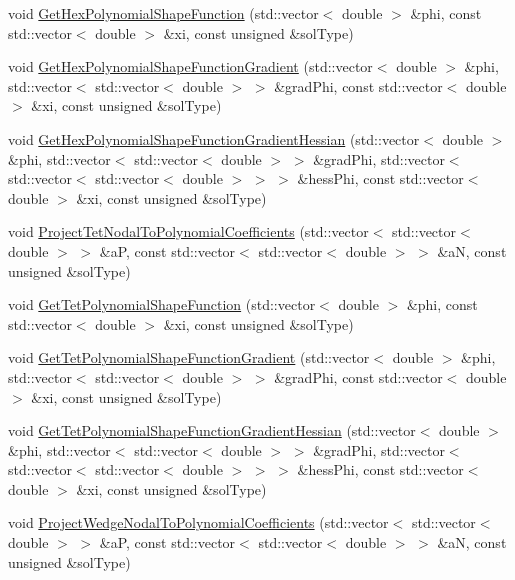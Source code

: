 \begin{DoxyCompactItemize}
\item 
void \mbox{\hyperlink{namespacefemus_ae4c2c2c514f4e0f9d59f4b57731a0f18}{Get\+Hex\+Polynomial\+Shape\+Function}} (std\+::vector$<$ double $>$ \&phi, const std\+::vector$<$ double $>$ \&xi, const unsigned \&sol\+Type)
\item 
void \mbox{\hyperlink{namespacefemus_ac1f55764bbd18de20213e01daa9aeda9}{Get\+Hex\+Polynomial\+Shape\+Function\+Gradient}} (std\+::vector$<$ double $>$ \&phi, std\+::vector$<$ std\+::vector$<$ double $>$ $>$ \&grad\+Phi, const std\+::vector$<$ double $>$ \&xi, const unsigned \&sol\+Type)
\item 
void \mbox{\hyperlink{namespacefemus_a1d9ba028f39ef32f218f17e03d0bbe53}{Get\+Hex\+Polynomial\+Shape\+Function\+Gradient\+Hessian}} (std\+::vector$<$ double $>$ \&phi, std\+::vector$<$ std\+::vector$<$ double $>$ $>$ \&grad\+Phi, std\+::vector$<$ std\+::vector$<$ std\+::vector$<$ double $>$ $>$ $>$ \&hess\+Phi, const std\+::vector$<$ double $>$ \&xi, const unsigned \&sol\+Type)
\item 
void \mbox{\hyperlink{namespacefemus_acd82a35cce2441436e19a7fbc240b13c}{Project\+Tet\+Nodal\+To\+Polynomial\+Coefficients}} (std\+::vector$<$ std\+::vector$<$ double $>$ $>$ \&aP, const std\+::vector$<$ std\+::vector$<$ double $>$ $>$ \&aN, const unsigned \&sol\+Type)
\item 
void \mbox{\hyperlink{namespacefemus_a74ed9e79d7eb35e7c4054a29b08ea878}{Get\+Tet\+Polynomial\+Shape\+Function}} (std\+::vector$<$ double $>$ \&phi, const std\+::vector$<$ double $>$ \&xi, const unsigned \&sol\+Type)
\item 
void \mbox{\hyperlink{namespacefemus_a05759cf7e10dcbfba9ada7036499b5f7}{Get\+Tet\+Polynomial\+Shape\+Function\+Gradient}} (std\+::vector$<$ double $>$ \&phi, std\+::vector$<$ std\+::vector$<$ double $>$ $>$ \&grad\+Phi, const std\+::vector$<$ double $>$ \&xi, const unsigned \&sol\+Type)
\item 
void \mbox{\hyperlink{namespacefemus_aa8fa3f5190981a28b13ad12b68ec7119}{Get\+Tet\+Polynomial\+Shape\+Function\+Gradient\+Hessian}} (std\+::vector$<$ double $>$ \&phi, std\+::vector$<$ std\+::vector$<$ double $>$ $>$ \&grad\+Phi, std\+::vector$<$ std\+::vector$<$ std\+::vector$<$ double $>$ $>$ $>$ \&hess\+Phi, const std\+::vector$<$ double $>$ \&xi, const unsigned \&sol\+Type)
\item 
void \mbox{\hyperlink{namespacefemus_ab24f1a73deab6a1df822604fd544a505}{Project\+Wedge\+Nodal\+To\+Polynomial\+Coefficients}} (std\+::vector$<$ std\+::vector$<$ double $>$ $>$ \&aP, const std\+::vector$<$ std\+::vector$<$ double $>$ $>$ \&aN, const unsigned \&sol\+Type)

\end{DoxyCompactItemize}
